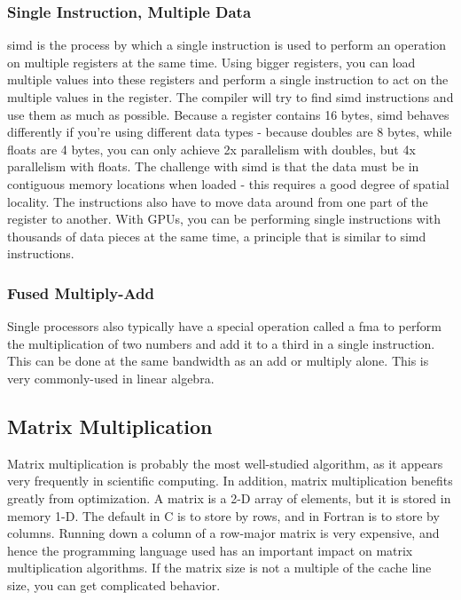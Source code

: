 \documentclass[10pt]{article}
\begin{document}
\begin{flushleft}
\subsubsection{Single Instruction, Multiple Data}

\gls{simd} is the process by which a single instruction is used to perform an operation on multiple registers at the same time. Using bigger registers, you can load multiple values into these registers and perform a single instruction to act on the multiple values in the register. The compiler will try to find \gls{simd} instructions and use them as much as possible. Because a register contains 16 bytes, \gls{simd} behaves differently if you're using different data types - because doubles are 8 bytes, while floats are 4 bytes, you can only achieve 2x parallelism with doubles, but 4x parallelism with floats. The challenge with \gls{simd} is that the data must be in contiguous memory locations when loaded - this requires a good degree of spatial locality. The instructions also have to move data around from one part of the register to another. With GPUs, you can be performing single instructions with thousands of data pieces at the same time, a principle that is similar to \gls{simd} instructions. 

\subsubsection{Fused Multiply-Add}

Single processors also typically have a special operation called a \gls{fma} to perform the multiplication of two numbers and add it to a third in a single instruction. This can be done at the same bandwidth as an add or multiply alone. This is very commonly-used in linear algebra.

\subsection{Matrix Multiplication}

Matrix multiplication is probably the most well-studied algorithm, as it appears very frequently in scientific computing. In addition, matrix multiplication benefits greatly from optimization. A matrix is a 2-D array of elements, but it is stored in memory 1-D. The default in C is to store by rows, and in Fortran is to store by columns. Running down a column of a row-major matrix is very expensive, and hence the programming language used has an important impact on matrix multiplication algorithms. If the matrix size is not a multiple of the cache line size, you can get complicated behavior.


\end{flushleft}
\end{document}
